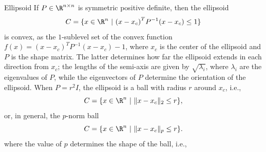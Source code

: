 \begin{ex}[Ellipsoid]{Ellipsoid}
    If $P \in \R^{n \times n}$ is symmetric positive definite, then the ellipsoid
    \begin{equation*}
        C = \{ x \in \R^n \ | \ {(x-x_c)}^T P^{-1} (x-x_c) \leq 1 \}
    \end{equation*}
    is convex, as the $1$-sublevel set of the convex function $f(x) = {(x-x_c)}^T P^{-1} (x-x_c) - 1$, where $x_c$ is the center of the ellipsoid and $P$ is the shape matrix. The latter determines how far the ellipsoid extends in each direction from $x_c$; the lengths of the semi-axis are given by $\sqrt{\lambda_i}$, where $\lambda_i$ are the eigenvalues of $P$, while the eigenvectors of $P$ determine the orientation of the ellipsoid. When $P = r^2I$, the ellipsoid is a ball with radius $r$ around $x_c$, i\@.e\@.,
    \begin{equation*}
        C = \{ x \in \R^n \ | \ \|x - x_c\|_{2} \leq r \},
    \end{equation*}
    or, in general, the $p$-norm ball
    \begin{equation*}
        C = \{ x \in \R^n \ | \ \|x - x_c\|_{p} \leq r \}.
    \end{equation*}
    where the value of $p$ determines the shape of the ball, i\@.e\@.,
    \vspace*{0.3cm}


\end{ex}
